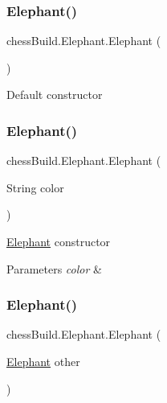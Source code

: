 \subsubsection{\texorpdfstring{Elephant()}{Elephant()}\hspace{0.1cm}{\footnotesize\ttfamily [1/4]}}
{\footnotesize\ttfamily chess\+Build.\+Elephant.\+Elephant (\begin{DoxyParamCaption}{ }\end{DoxyParamCaption})}

Default constructor \mbox{\label{classchess_build_1_1_elephant_ac60142f5a3931dbbf71ecc65358d43a3}} 
\subsubsection{\texorpdfstring{Elephant()}{Elephant()}\hspace{0.1cm}{\footnotesize\ttfamily [2/4]}}
{\footnotesize\ttfamily chess\+Build.\+Elephant.\+Elephant (\begin{DoxyParamCaption}\item[{String}]{color }\end{DoxyParamCaption})}

\hyperlink{classchess_build_1_1_elephant}{Elephant} constructor 
\begin{DoxyParams}{Parameters}
{\em color} & \\
\hline
\end{DoxyParams}
\mbox{\label{classchess_build_1_1_elephant_a0323849e4a8078589161ab4d684f56ce}} 
\subsubsection{\texorpdfstring{Elephant()}{Elephant()}\hspace{0.1cm}{\footnotesize\ttfamily [3/4]}}
{\footnotesize\ttfamily chess\+Build.\+Elephant.\+Elephant (\begin{DoxyParamCaption}\item[{\hyperlink{classchess_build_1_1_elephant}{Elephant}}]{other }\end{DoxyParamCaption})}

